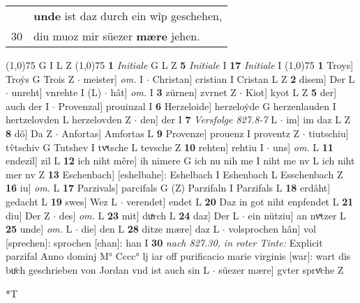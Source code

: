 \documentclass[8pt,a4paper,notitlepage]{article}
\begin{document}
\begin{table}[ht]
\begin{minipage}[t]{0.5\linewidth}
\begin{tabular}{rl}
 & \textbf{unde} ist daz durch ein wîp geschehen,\\ 
30 & diu muoz mir süezer \textbf{mære} jehen.\\ 
\end{tabular}
\scriptsize
\line(1,0){75} \newline
G I L Z \newline
\line(1,0){75} \newline
\textbf{1} \textit{Initiale} G L Z  \textbf{5} \textit{Initiale} I  \textbf{17} \textit{Initiale} I  \newline
\line(1,0){75} \newline
\textbf{1} Troys] Troẏs G Trois Z  $\cdot$ meister] \textit{om.} I  $\cdot$ Christan] cristian I Cristan L Z \textbf{2} disem] Der L  $\cdot$ unreht] vnrehte I (L)  $\cdot$ hât] \textit{om.} I \textbf{3} zürnen] zvrnet Z  $\cdot$ Kiot] kyot L Z \textbf{5} der] auch der I  $\cdot$ Provenzal] prouinzal I \textbf{6} Herzeloide] herzeloẏde G herzenlauden I hertzelovden L herzelovden Z  $\cdot$ den] der I \textbf{7} \textit{Versfolge 827.8-7} L   $\cdot$ im] im daz L Z \textbf{8} dô] Da Z  $\cdot$ Anfortas] Amfortas L \textbf{9} Provenze] prouenz I proventz Z  $\cdot$ tiutschiu] tv̂tschiv G Tutshev I tvͯtsche L tevsche Z \textbf{10} rehten] rehtiu I  $\cdot$ uns] \textit{om.} L \textbf{11} endezil] zil L \textbf{12} ich niht mêre] ih nimere G ich nu nih me I niht me nv L ich niht mer nv Z \textbf{13} Eschenbach] [eshelbahe]: Eshelbach I Eshenbach L Esschenbach Z \textbf{16} iu] \textit{om.} L \textbf{17} Parzivals] parcifals G (Z) Parzifaln I Parzifals L \textbf{18} erdâht] gedacht L \textbf{19} swes] Wez L  $\cdot$ verendet] endet L \textbf{20} Daz in got niht enpfendet L \textbf{21} diu] Der Z  $\cdot$ des] \textit{om.} L \textbf{23} mit] duͯrch L \textbf{24} daz] Der L  $\cdot$ ein nütziu] an nvͯtzer L \textbf{25} unde] \textit{om.} L  $\cdot$ die] den L \textbf{28} ditze mære] daz L  $\cdot$ volsprochen hân] vol [sprechen]: sprochen [chan]: han I \textbf{30} \textit{nach 827.30, in roter Tinte:} Explicit parzifal Anno dominj M° Cccc° lj iar off purificacio marie virginis [war]: wart dis buͦch geschrieben von Jordan vnd ist auch sin L   $\cdot$ süezer mære] gvter sprvͤche Z \newline
\end{minipage}
\hspace{0.5cm}
\begin{minipage}[t]{0.5\linewidth}
\small
\begin{center}*T
\end{center}
\begin{tabular}{rl}

\end{tabular}
\end{minipage}
\end{table}
\end{document}
